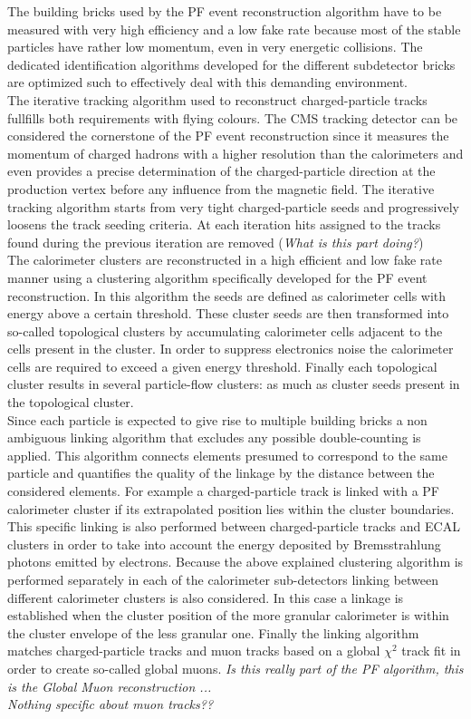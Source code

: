 The building bricks used by the PF event reconstruction algorithm have to be measured with very high efficiency and a low fake rate because most of the stable particles have rather low momentum, even in very energetic collisions.
The dedicated identification algorithms developed for the different subdetector bricks are optimized such to effectively deal with this demanding environment.
\\
The iterative tracking algorithm used to reconstruct charged-particle tracks fullfills both requirements with flying colours. The CMS tracking detector can be considered the cornerstone of the PF event reconstruction since it measures the momentum of charged hadrons with a higher resolution than the calorimeters and even provides a precise determination of the charged-particle direction at the production vertex before any influence from the magnetic field. The iterative tracking algorithm starts from very tight charged-particle seeds and progressively loosens the track seeding criteria. At each iteration hits assigned to the tracks found during the previous iteration are removed (\textit{What is this part doing?})
\\
The calorimeter clusters are reconstructed in a high efficient and low fake rate manner using a clustering algorithm specifically developed for the PF event reconstruction. In this algorithm the seeds are defined as calorimeter cells with energy above a certain threshold. These cluster seeds are then transformed into so-called topological clusters by accumulating calorimeter cells adjacent to the cells present in the cluster. In order to suppress electronics noise the calorimeter cells are required to exceed a given energy threshold. Finally each topological cluster results in several particle-flow clusters: as much as cluster seeds present in the topological cluster.
\\

Since each particle is expected to give rise to multiple building bricks a non ambiguous linking algorithm that excludes any possible double-counting is applied. This algorithm connects elements presumed to correspond to the same particle and quantifies the quality of the linkage by the distance between the considered elements. For example a charged-particle track is linked with a PF calorimeter cluster if its extrapolated position lies within the cluster boundaries. This specific linking is also performed between charged-particle tracks and ECAL clusters in order to take into account the energy deposited by Bremsstrahlung photons emitted by electrons. Because the above explained clustering algorithm is performed separately in each of the calorimeter sub-detectors linking between different calorimeter clusters is also considered. In this case a linkage is established when the cluster position of the more granular calorimeter is within the cluster envelope of the less granular one. Finally the linking algorithm matches charged-particle tracks and muon tracks based on a global $\chi^{2}$ track fit in order to create so-called global muons. \textit{Is this really part of the PF algorithm, this is the Global Muon reconstruction ...}
\\
\textit{Nothing specific about muon tracks??}

